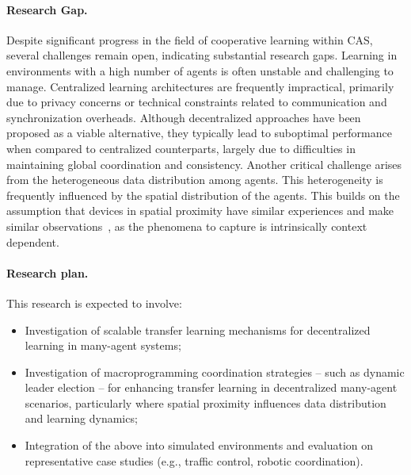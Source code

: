 \documentclass[12pt]{article}
\begin{document}
\paragraph{Research Gap.}
Despite significant progress in the field of cooperative learning within CAS, 
 several challenges remain open, indicating substantial research gaps.
%
Learning in environments with a high number of agents is often unstable and challenging to manage. 
%
Centralized learning architectures are frequently impractical, primarily due to privacy concerns or technical 
 constraints related to communication and synchronization overheads. 
% 
Although decentralized approaches have been proposed as a viable alternative, they typically lead to 
 suboptimal performance when compared to centralized counterparts, largely due to difficulties in maintaining global 
 coordination and consistency.
%
Another critical challenge arises from the heterogeneous data distribution among agents.
% 
This heterogeneity is frequently influenced by the spatial distribution of the agents.
%
This builds on the assumption that devices in spatial proximity have similar experiences and make similar 
 observations~\cite{esterle2022deep}, as
 the phenomena to capture is intrinsically context dependent.

\paragraph{Research plan.}
This research is expected to involve:
\begin{itemize}
	\item Investigation of scalable transfer learning mechanisms for decentralized learning in many-agent systems;
	\item Investigation of macroprogramming coordination strategies -- such as dynamic leader election -- for enhancing 
	 transfer learning in decentralized many-agent scenarios, particularly where spatial proximity influences 
	 data distribution and learning dynamics;
	\item Integration of the above into simulated environments and evaluation on representative case studies 
	 (e.g., traffic control, robotic coordination).
\end{itemize}



\end{document}
